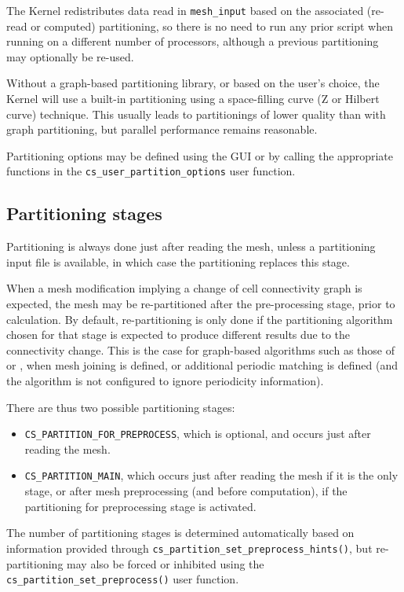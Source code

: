 {{The Kernel redistributes data read in {\tt mesh\_input} based on the associated
(re-read or computed) partitioning, so there is no need to run any
prior script when running on a different number of processors, although
a previous partitioning may optionally be re-used.

Without a graph-based partitioning library, or based on the user's choice,
the Kernel will use a built-in partitioning using a space-filling curve
(Z or Hilbert curve) technique. This usually leads to partitionings
of lower quality than with graph partitioning, but parallel
performance remains reasonable.

Partitioning options may be defined using the GUI or by calling
the appropriate functions in the
\texttt{cs\_user\_partition\_options} user function.

\subsection{Partitioning stages\label{sec:parall:part:stages}}

Partitioning is always done just after reading the mesh, unless a
partitioning input file is available, in which case the partitioning
replaces this stage.

When a mesh modification implying a change of cell connectivity graph
is expected, the mesh may be re-partitioned after the pre-processing
stage, prior to calculation. By default, re-partitioning is only done
if the partitioning algorithm chosen for that stage is expected to
produce different results due to the connectivity change. This is
the case for graph-based algorithms such as those of \metis or \scotch,
when mesh joining is defined, or additional periodic matching is defined
(and the algorithm is not configured to ignore periodicity information).

There are thus two possible partitioning stages:

\begin{itemize}
\item \texttt{CS\_PARTITION\_FOR\_PREPROCESS}, which is optional, and
      occurs just  after reading the mesh.
\item \texttt{CS\_PARTITION\_MAIN}, which occurs just after reading the
      mesh if it is the only stage, or after mesh preprocessing (and
      before computation), if the partitioning for preprocessing stage
      is activated.
\end{itemize}

The number of partitioning stages is determined automatically based on
information provided through \texttt{cs\_partition\_set\_preprocess\_hints()},
but re-partitioning may also be forced or inhibited using the
\texttt{cs\_partition\_set\_preprocess()} user function.

}}
